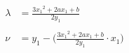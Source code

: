 
\begin{align*}
\lambda &= \frac{3{x_1}^2 + 2 a x_1 + b}{2 y_1} \\
\\
\nu &= y_1 - \biggr( \frac{3{x_1}^2 + 2 a x_1 + b}{2 y_1} \cdot x_1 \biggl)\\
\end{align*}
